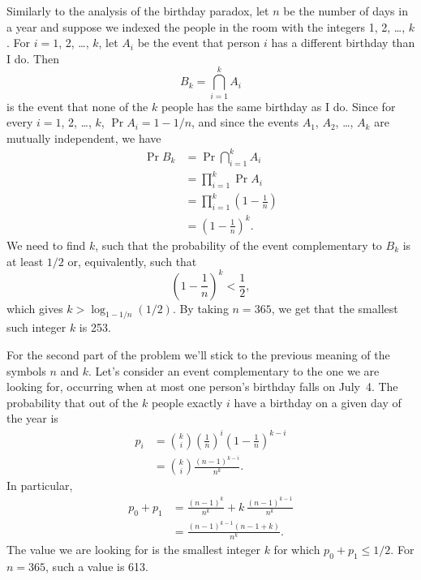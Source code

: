 Similarly to the analysis of the birthday paradox, let $n$ be the number of days in a year and suppose we indexed the people in the room with the integers 1, 2, \dots, $k$.
For $i=1$, 2, \dots, $k$, let $A_i$ be the event that person $i$ has a different birthday than I do.
Then
\[
    B_k = \bigcap_{i=1}^kA_i
\]
is the event that none of the $k$ people has the same birthday as I do.
Since for every $i=1$, 2, \dots, $k$, $\Pr{A_i}=1-1/n$, and since the events $A_1$, $A_2$, \dots, $A_k$ are mutually independent, we have
\begin{align*}
    \Pr{B_k} &= \Pr{\bigcap_{i=1}^kA_i} \\
    &= \prod_{i=1}^k\Pr{A_i} \\
    &= \prod_{i=1}^k\left(1-\frac{1}{n}\right) \\
    &= \left(1-\frac{1}{n}\right)^k.
\end{align*}
We need to find $k$, such that the probability of the event complementary to $B_k$ is at least $1/2$ or, equivalently, such that
\[
    \left(1-\frac{1}{n}\right)^k < \frac{1}{2},
\]
which gives $k>\log_{1-1/n}(1/2)$.
By taking $n=365$, we get that the smallest such integer $k$ is 253.

For the second part of the problem we'll stick to the previous meaning of the symbols $n$ and $k$.
Let's consider an event complementary to the one we are looking for, occurring when at most one person's birthday falls on July~4.
The probability that out of the $k$ people exactly $i$ have a birthday on a given day of the year is
\begin{align*}
    p_i &= \binom{k}{i}\left(\frac{1}{n}\right)^i\left(1-\frac{1}{n}\right)^{k-i} \\
    &= \binom{k}{i}\frac{(n-1)^{k-i}}{n^k}.
\end{align*}
In particular,
\begin{align*}
    p_0+p_1 &= \frac{(n-1)^k}{n^k}+k\,\frac{(n-1)^{k-1}}{n^k} \\
    &= \frac{(n-1)^{k-1}(n-1+k)}{n^k}.
\end{align*}
The value we are looking for is the smallest integer $k$ for which $p_0+p_1\le1/2$.
For $n=365$, such a value is 613.
